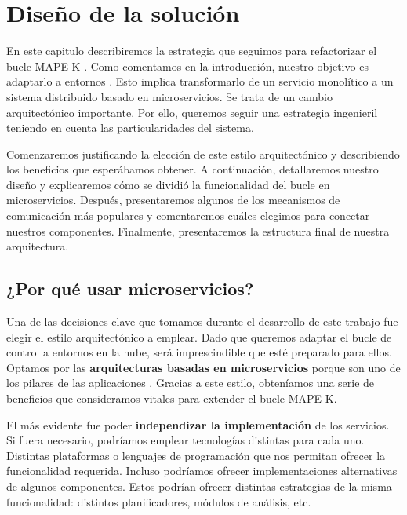 \chapter{Diseño de la solución}
\label{chap:diseño}

En este capitulo describiremos la estrategia que seguimos para refactorizar el bucle MAPE-K . Como comentamos en la introducción, nuestro objetivo es adaptarlo a entornos . Esto implica transformarlo de un servicio monolítico a un sistema distribuido basado en microservicios. Se trata de un cambio arquitectónico importante. Por ello, queremos seguir una estrategia ingenieril teniendo en cuenta las particularidades del sistema.

Comenzaremos justificando la elección de este estilo arquitectónico y describiendo los beneficios que esperábamos obtener. A continuación, detallaremos nuestro diseño y explicaremos cómo se dividió la funcionalidad del bucle en microservicios. Después, presentaremos algunos de los mecanismos de comunicación más populares y comentaremos cuáles elegimos para conectar nuestros componentes. Finalmente, presentaremos la estructura final de nuestra arquitectura.

\section{¿Por qué usar microservicios?}

Una de las decisiones clave que tomamos durante el desarrollo de este trabajo fue elegir el estilo arquitectónico a emplear. Dado que queremos adaptar el bucle de control a entornos en la nube, será imprescindible que esté preparado para ellos. Optamos por las \textbf{arquitecturas basadas en microservicios} porque son uno de los pilares de las aplicaciones . \cite{gannonCloudNativeApplications2017} Gracias a este estilo, obteníamos una serie de beneficios que consideramos vitales para extender el bucle MAPE-K.

El más evidente fue poder \textbf{independizar la implementación} de los servicios. Si fuera necesario, podríamos emplear tecnologías distintas para cada uno. Distintas plataformas o lenguajes de programación que nos permitan ofrecer la funcionalidad requerida. Incluso podríamos ofrecer implementaciones alternativas de algunos componentes. Estos podrían ofrecer distintas estrategias de la misma funcionalidad: distintos planificadores, módulos de análisis, etc.

